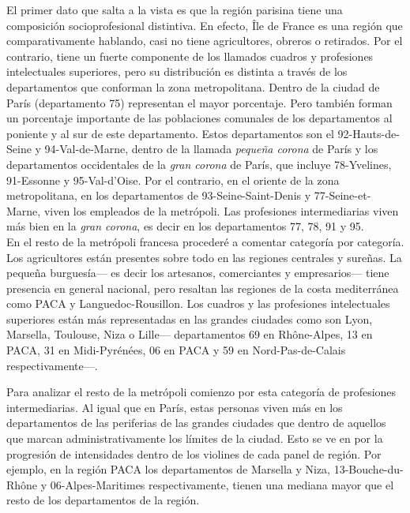  El primer dato que salta a la vista es que la región parisina tiene una composición socioprofesional distintiva. En efecto, Île de France es una región que comparativamente hablando, casi no tiene agricultores, obreros o retirados. Por el contrario, tiene un fuerte componente de los llamados cuadros y profesiones intelectuales superiores, pero su distribución es distinta a través de los departamentos que conforman la zona metropolitana. Dentro de la ciudad de París (departamento 75) representan el mayor porcentaje. Pero también forman un porcentaje importante de las poblaciones comunales de los departamentos al poniente y al sur de este departamento.  Estos departamentos son el 92-Hauts-de-Seine y 94-Val-de-Marne, dentro de la llamada \textit{pequeña corona} de París y los departamentos occidentales de la \textit{gran corona} de París, que incluye 78-Yvelines, 91-Essonne y 95-Val-d'Oise. Por el contrario, en el oriente de la zona metropolitana, en los departamentos de 93-Seine-Saint-Denis y 77-Seine-et-Marne, viven los empleados de la metrópoli. Las profesiones intermediarias viven más bien en la \textit{gran corona}, es decir en los departamentos 77, 78, 91 y 95.\\
 
 En el resto de la metrópoli francesa procederé a comentar categoría por categoría. Los agricultores están presentes sobre todo en las regiones centrales y sureñas. La pequeña burguesía--- es decir los artesanos, comerciantes y empresarios--- tiene presencia en general nacional, pero resaltan las regiones de la costa mediterránea como PACA y Languedoc-Rousillon. Los cuadros y las profesiones intelectuales superiores están más representadas en las grandes ciudades como son Lyon, Marsella, Toulouse, Niza o Lille--- departamentos 69 en Rhône-Alpes, 13 en PACA, 31 en Midi-Pyrénées, 06 en PACA y 59 en Nord-Pas-de-Calais respectivamente---.  
 
 Para analizar el resto de la metrópoli comienzo por esta categoría de profesiones intermediarias. Al igual que en París, estas personas viven más en los departamentos de las periferias de las grandes ciudades que dentro de aquellos que marcan administrativamente los límites de la ciudad. Esto se ve en  por la progresión de intensidades dentro de los violines de cada panel de región. Por ejemplo, en la región PACA los departamentos de Marsella y Niza, 13-Bouche-du-Rhône y 06-Alpes-Maritimes respectivamente, tienen una mediana mayor que el resto de los departamentos de la región. 